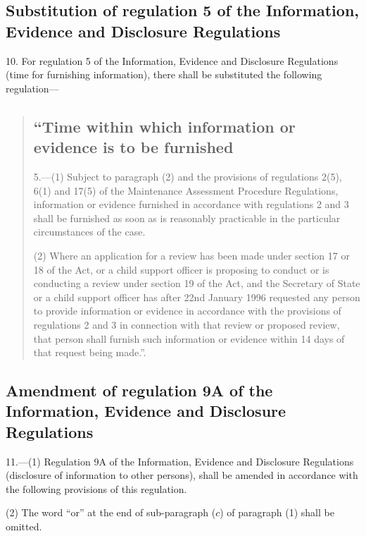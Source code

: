 \documentclass[a4paper]{article}
\begin{document}
\subsection[10. Substitution of regulation 5 of the Information, Evidence and Disclosure Regulations]{Substitution of regulation 5 of the Information, Evidence and Disclosure Regulations}

10.  For regulation 5 of the Information, Evidence and Disclosure Regulations (time for furnishing information), there shall be substituted the following regulation—
\begin{quotation}
\subsection*{“Time within which information or evidence is to be furnished}

5.—(1) Subject to paragraph (2) and the provisions of regulations 2(5), 6(1) and 17(5) of the Maintenance Assessment Procedure Regulations, information or evidence furnished in accordance with regulations 2 and 3 shall be furnished as soon as is reasonably practicable in the particular circumstances of the case.

(2) Where an application for a review has been made under section 17 or 18 of the Act, or a child support officer is proposing to conduct or is conducting a review under section 19 of the Act, and the Secretary of State or a child support officer has after 22nd January 1996 requested any person to provide information or evidence in accordance with the provisions of regulations 2 and 3 in connection with that review or proposed review, that person shall furnish such information or evidence within 14 days of that request being made.”.
\end{quotation}

\subsection[11. Amendment of regulation 9A of the Information, Evidence and Disclosure Regulations]{Amendment of regulation 9A of the Information, Evidence and Disclosure Regulations}

11.—(1) Regulation 9A of the Information, Evidence and Disclosure Regulations (disclosure of information to other persons), shall be amended in accordance with the following provisions of this regulation.

(2) The word “or” at the end of sub-paragraph ($c$) of paragraph (1) shall be omitted.
\end{document}
